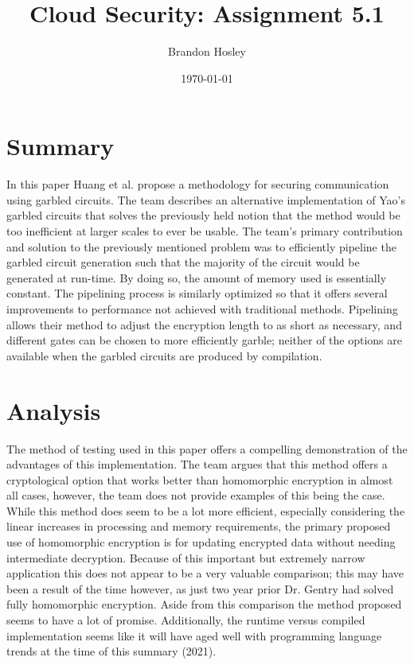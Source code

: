 \documentclass[]{article}
\title{Cloud Security: Assignment 5.1}
\author{Brandon Hosley}
\date{\today}
\begin{document}
	\maketitle
	
\section{Summary} 

In this paper\cite{Huang2011} Huang et al. propose a methodology for securing communication using garbled circuits.
The team describes an alternative implementation of Yao's garbled circuits that solves the previously held notion that the method would be too inefficient at larger scales to ever be usable.
The team's primary contribution and solution to the previously mentioned problem was to efficiently pipeline the garbled circuit generation such that the majority of the circuit would be generated at run-time.
By doing so, the amount of memory used is essentially constant.
The pipelining process is similarly optimized so that it offers several improvements to performance not achieved with traditional methods.
Pipelining allows their method to adjust the encryption length to as short as necessary,
and different gates can be chosen to more efficiently garble;
neither of the options are available when the garbled circuits are produced by compilation.


\section{Analysis}

The method of testing used in this paper offers a compelling demonstration of the advantages of this implementation.
The team argues that this method offers a cryptological option that works better than homomorphic encryption in almost all cases,
however, the team does not provide examples of this being the case.
While this method does seem to be a lot more efficient, especially considering the linear increases in processing and memory requirements,
the primary proposed use of homomorphic encryption is for updating encrypted data without needing intermediate decryption.
Because of this important but extremely narrow application this does not appear to be a very valuable comparison;
this may have been a result of the time however, as just two year prior Dr. Gentry had solved fully homomorphic encryption.
Aside from this comparison the method proposed seems to have a lot of promise.
Additionally, the runtime versus compiled implementation seems like it will have aged well with programming language trends at the time of this summary (2021).


\clearpage


\end{document}
